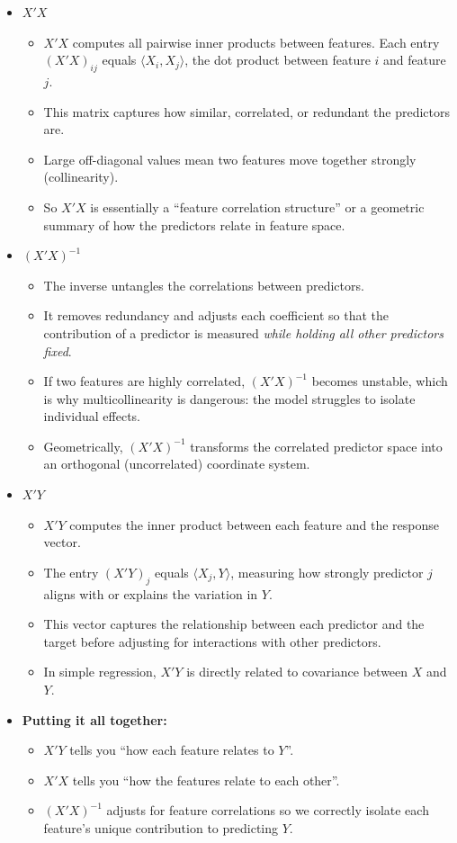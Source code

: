 \documentclass[10pt,a4paper]{article}
\begin{document}
	\begin{itemize}
		\item \textbf{$X'X$}
		\begin{itemize}
			\item $X'X$ computes all pairwise inner products between features.
			Each entry $(X'X)_{ij}$ equals $\langle X_i, X_j \rangle$, the dot product between feature $i$ and feature $j$.
			\item This matrix captures how similar, correlated, or redundant the predictors are.
			\item Large off-diagonal values mean two features move together strongly (collinearity).
			\item So $X'X$ is essentially a ``feature correlation structure'' or a geometric summary of how the predictors relate in feature space.
		\end{itemize}

		\item \textbf{$(X'X)^{-1}$}
		\begin{itemize}
			\item The inverse untangles the correlations between predictors.
			\item It removes redundancy and adjusts each coefficient so that the contribution of a predictor is measured \emph{while holding all other predictors fixed}.
			\item If two features are highly correlated, $(X'X)^{-1}$ becomes unstable, which is why multicollinearity is dangerous: the model struggles to isolate individual effects.
			\item Geometrically, $(X'X)^{-1}$ transforms the correlated predictor space into an orthogonal (uncorrelated) coordinate system.
		\end{itemize}

		\item \textbf{$X'Y$}
		\begin{itemize}
			\item $X'Y$ computes the inner product between each feature and the response vector.
			\item The entry $(X'Y)_j$ equals $\langle X_j, Y \rangle$, measuring how strongly predictor $j$ aligns with or explains the variation in $Y$.
			\item This vector captures the relationship between each predictor and the target before adjusting for interactions with other predictors.
			\item In simple regression, $X'Y$ is directly related to covariance between $X$ and $Y$.
		\end{itemize}

		\item \textbf{Putting it all together:}
		\begin{itemize}
			\item $X'Y$ tells you ``how each feature relates to $Y$''.
			\item $X'X$ tells you ``how the features relate to each other''.
			\item $(X'X)^{-1}$ adjusts for feature correlations so we correctly isolate each feature's unique contribution to predicting $Y$.
		\end{itemize}
	\end{itemize}
\end{document}
